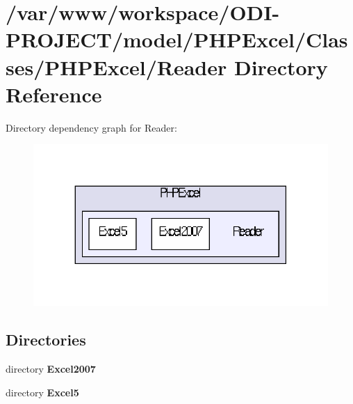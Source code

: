 \section{/var/www/workspace/\+O\+D\+I-\/\+P\+R\+O\+J\+E\+C\+T/model/\+P\+H\+P\+Excel/\+Classes/\+P\+H\+P\+Excel/\+Reader Directory Reference}
\label{dir_9b2418350060bde263436b2eb62effdf}
Directory dependency graph for Reader\+:\nopagebreak
\begin{figure}[H]
\begin{center}
\leavevmode
\includegraphics[width=338pt]{dir_9b2418350060bde263436b2eb62effdf_dep}
\end{center}
\end{figure}
\subsection*{Directories}
\begin{DoxyCompactItemize}
\item 
directory {\bf Excel2007}
\item 
directory {\bf Excel5}
\end{DoxyCompactItemize}
